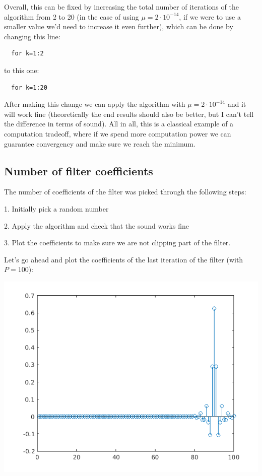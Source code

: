 \documentclass[conference,9pt]{IEEEtran}
\begin{document}
Overall, this can be fixed by increasing the total number of iterations of the algorithm from 2 to 20 (in the case of using $\mu=2\cdot 10^{-14}$, if we were to use a smaller value we'd need to increase it even further), which can be done by changing this line:
\begin{verbatim}
  for k=1:2
\end{verbatim}

to this one:
\begin{verbatim}
  for k=1:20
\end{verbatim}

After making this change we can apply the algorithm with $\mu=2\cdot 10^{-14}$ and it will work fine (theoretically the end results should also be better, but I can't tell the difference in terms of sound). All in all, this is a classical example of a computation tradeoff, where if we spend more computation power we can guarantee convergency and make sure we reach the minimum.

\subsection{Number of filter coefficients}

The number of coefficients of the filter was picked through the following steps:

1. Initially pick a random number

2. Apply the algorithm and check that the sound works fine

3. Plot the coefficients to make sure we are not clipping part of the filter.

Let's go ahead and plot the coefficients of the last iteration of the filter (with $P=100$):

\includegraphics[scale=0.6]{coef.png}
\end{document}
